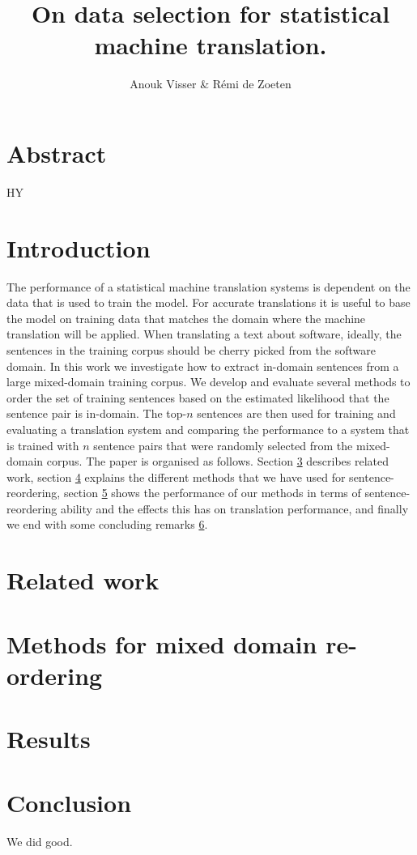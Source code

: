 \documentclass[11pt]{article}
\title{On data selection for statistical machine translation.}
\author{Anouk Visser \& R\'emi de Zoeten}
\date{}
\begin{document}
\maketitle
\newpage
\tableofcontents
\newpage

\section{Abstract}
HY

\section{Introduction}
\label{sec:intro}
The performance of a statistical machine translation systems is dependent on the data that is used to train the model. For accurate translations it is useful to base the model on training data that matches the domain where the machine translation will be applied. When translating a text about software, ideally, the sentences in the training corpus should be cherry picked from the software domain. 
In this work we investigate how to extract in-domain sentences from a large mixed-domain training corpus. We develop and evaluate several methods to order the set of training sentences based on the estimated likelihood that the sentence pair is in-domain. The top-$n$ sentences are then used for training and evaluating a translation system and comparing the performance to a system that is trained with $n$ sentence pairs that were randomly selected from the mixed-domain corpus.
The paper is organised as follows. Section \ref{sec:related} describes related work, section \ref{sec:methods} explains the different methods that we have used for sentence-reordering, section \ref{sec:results} shows the performance of our methods in terms of sentence-reordering ability and the effects this has on translation performance, and finally we end with some concluding remarks \ref{sec:conclusion}.

\section{Related work}
\label{sec:related}

\section{Methods for mixed domain re-ordering}
\label{sec:methods}

\section{Results}
\label{sec:results}

\section{Conclusion}
\label{sec:conclusion}
We did good.


\end{document}
